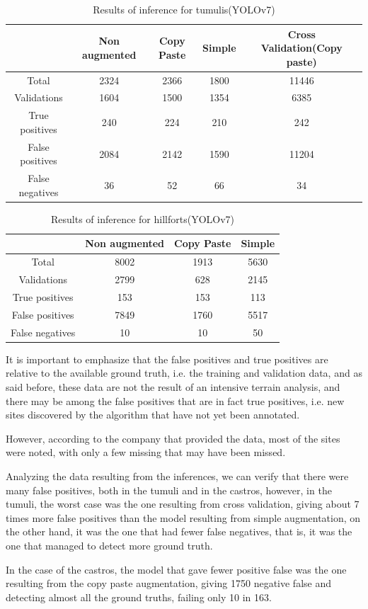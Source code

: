 \begin{table}[h!]
\centering
\begin{tabular}{|c c c c c|} 
 \hline
  & Non augmented  & Copy Paste & Simple & Cross Validation(Copy paste) \\ [0.5ex] 
 \hline\hline
 Total & 2324 & 2366 & 1800 & 11446 \\ 
 Validations & 1604 & 1500 & 1354 & 6385 \\
 True positives & 240 & 224 & 210 & 242 \\
 False positives & 2084 & 2142 & 1590 & 11204 \\
 False negatives & 36 & 52 & 66 & 34 \\ [1ex] 
 \hline
\end{tabular}
\caption{Results of inference for tumulis(YOLOv7)}
\end{table}

\begin{table}[H]
\centering
\begin{tabular}{|c c c c|} 
 \hline
  & Non augmented  & Copy Paste & Simple \\ [0.5ex] 
 \hline\hline
 Total & 8002 & 1913 & 5630 \\ 
 Validations & 2799 & 628 & 2145\\
 True positives & 153 & 153 & 113 \\
 False positives & 7849 & 1760 & 5517 \\
 False negatives & 10 & 10 & 50\\ [1ex] 
 \hline
\end{tabular}
\caption{Results of inference for hillforts(YOLOv7)}
\end{table}
It is important to emphasize that the false positives and true positives are relative to the available ground truth, i.e. the training and validation data, and as said before, these data are not the result of an intensive terrain analysis, and there may be among the false positives that are in fact true positives, i.e. new sites discovered by the algorithm that have not yet been annotated.

However, according to the company that provided the data, most of the sites were noted, with only a few missing that may have been missed.

Analyzing the data resulting from the inferences, we can verify that there were many false positives, both in the tumuli and in the castros, however, in the tumuli, the worst case was the one resulting from cross validation, giving about 7 times more false positives than the model resulting from simple augmentation, on the other hand, it was the one that had fewer false negatives, that is, it was the one that managed to detect more ground truth.

In the case of the castros, the model that gave fewer positive false was the one resulting from the copy paste augmentation, giving 1750 negative false and detecting almost all the ground truths, failing only 10 in 163.